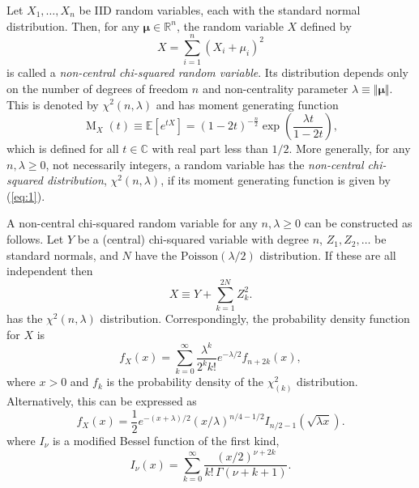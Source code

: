 \documentclass[12pt]{article}
\begin{document}

Let $X_1,\ldots,X_n$ be IID random variables, each with the standard normal distribution.  Then, for any $\boldsymbol{\mu}\in\mathbb{R}^n$, the random variable $X$ defined by 
\begin{equation*}
X=\sum_{i=1}^{n}(X_i+\mu_i)^2
\end{equation*}
is called a \emph{non-central chi-squared random variable}.
Its distribution depends only on the number of degrees of freedom $n$ and non-centrality parameter $\lambda\equiv\Vert\boldsymbol{\mu}\Vert$. This is denoted by $\chi^2(n,\lambda)$ and has moment generating function
\begin{equation}\label{eq:1}
\operatorname{M}_X(t)\equiv\mathbb{E}\left[e^{tX}\right]=\left(1-2t\right)^{-\frac{n}{2}}\exp\left(\frac{\lambda t}{1-2t}\right),
\end{equation}
which is defined for all $t\in\mathbb{C}$ with real part less than $1/2$.
More generally, for any $n,\lambda\ge 0$, not necessarily integers, a random variable has the  \emph{non-central chi-squared distribution}, $\chi^2(n,\lambda)$, if its moment generating function is given by (\ref{eq:1}).

A non-central chi-squared random variable for any $n,\lambda\ge 0$ can be constructed as follows. Let $Y$ be a (central) chi-squared variable with degree $n$, $Z_1,Z_2,\ldots$ be standard normals, and $N$ have the $\textrm{Poisson}(\lambda/2)$ distribution. If these are all independent then
\begin{equation*}
X\equiv Y+\sum_{k=1}^{2N}Z_k^2.
\end{equation*}
has the $\chi^2(n,\lambda)$ distribution. Correspondingly, the probability density function for $X$ is
\begin{equation}\label{eq:2}
f_X(x)=\sum_{k=0}^\infty \frac{\lambda^k}{2^k k!}e^{-\lambda/2} f_{n+2k}(x),
\end{equation}
where $x>0$ and $f_k$ is the probability density of the $\chi^2_{(k)}$ distribution.
Alternatively, this can be expressed as
\begin{equation*}
f_X(x)=\frac{1}{2}e^{-(x+\lambda)/2}(x/\lambda)^{n/4-1/2}I_{n/2-1}\left(\sqrt{\lambda x}\right).
\end{equation*}
where $I_\nu$ is a modified Bessel function of the first kind,
\begin{equation*}
I_\nu(x)=\sum_{k=0}^\infty\frac{\left(x/2\right)^{\nu+2k}}{k!\,\Gamma\left(\nu+k+1\right)}.
\end{equation*}
\end{document}
